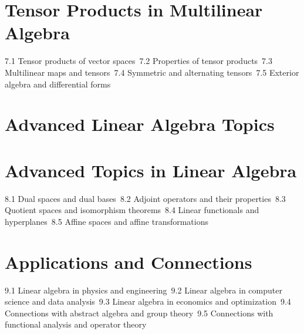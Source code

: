 \section{Tensor Products in Multilinear Algebra}
7.1 Tensor products of vector spaces\
7.2 Properties of tensor products\
7.3 Multilinear maps and tensors\
7.4 Symmetric and alternating tensors\
7.5 Exterior algebra and differential forms\
\section{Advanced Linear Algebra Topics}
\section{Advanced Topics in Linear Algebra}
8.1 Dual spaces and dual bases\
8.2 Adjoint operators and their properties\
8.3 Quotient spaces and isomorphism theorems\
8.4 Linear functionals and hyperplanes\
8.5 Affine spaces and affine transformations\
\section{Applications and Connections}
9.1 Linear algebra in physics and engineering\
9.2 Linear algebra in computer science and data analysis\
9.3 Linear algebra in economics and optimization\
9.4 Connections with abstract algebra and group theory\
9.5 Connections with functional analysis and operator theory\
